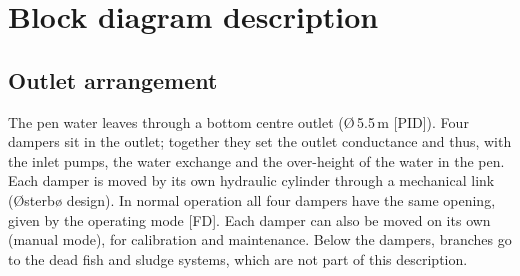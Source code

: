 \documentclass[11pt,a4paper]{article}
\begin{document}
\section{Block diagram description}
\label{sec:block}

\subsection{Outlet arrangement}
The pen water leaves through a bottom centre outlet (\O\,5.5\,m [PID]). Four dampers sit in the
outlet; together they set the outlet conductance and thus, with the inlet pumps, the water exchange
and the over-height of the water in the pen. Each damper is moved by its own hydraulic cylinder
through a mechanical link (Østerbø design). In normal operation all four dampers have the same
opening, given by the operating mode [FD]. Each damper can also be moved on its own (manual mode),
for calibration and maintenance. Below the dampers, branches go to the dead fish and sludge
systems, which are not part of this description.
\end{document}
